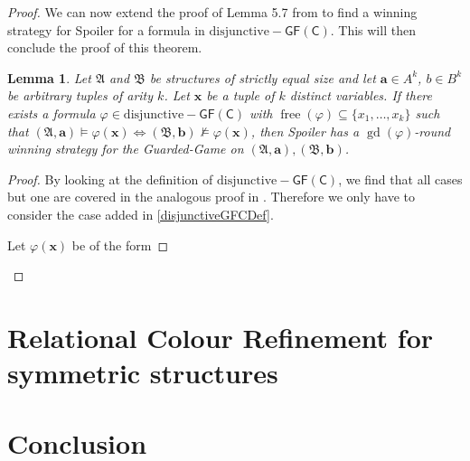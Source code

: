 \documentclass[a4paper,11pt,DIV=15]{scrartcl} %
\renewcommand{\phi}{\varphi}
\theoremstyle{plain}
\newtheorem{lemma}[theorem]{Lemma}
\theoremstyle{definition}
\newcommand{\GFC}{\mathsf{GF}(\mathsf{C})}
\newcommand{\free}[1]{\operatorname{free}(#1)}
\newcommand{\gd}[1]{\operatorname{gd}(#1)}
\newcommand{\disjunctiveGFC}{\operatorname{disjunctive-\GFC}}
\begin{document}
\begin{proof}
	We can now extend the proof of Lemma 5.7 from \cite{scheidt2025ColorRefinement} to find a winning strategy for Spoiler for a formula in $\disjunctiveGFC$.
	This will then conclude the proof of this theorem.
	
	\begin{lemma}
		Let $\mathfrak A$ and $\mathfrak B$ be structures of strictly equal size and let $\mathbf a\in A^k$, $b\in B^k$ be arbitrary tuples of arity $k$.
		Let $\mathbf x$ be a tuple of $k$ distinct variables.
		If there exists a formula $\phi\in\operatorname{disjunctive-\GFC}$ with $\free{\phi}\subseteq\{x_1,\dots,x_k\}$ such that $(\mathfrak A,\mathbf a)\models \phi(\mathbf x) \Longleftrightarrow (\mathfrak B,\mathbf b)\not\models \phi(\mathbf x)$, then Spoiler has a $\gd{\phi}$-round winning strategy for the Guarded-Game on $(\mathfrak A,\mathbf a),(\mathfrak B,\mathbf b)$.
	\end{lemma}
	\begin{proof}
		By looking at the definition of $\disjunctiveGFC$, we find that all cases but one are covered in the analogous proof in \cite{scheidt2025ColorRefinement}.
		Therefore we only have to consider the case added in \cref{disjunctiveGFCDef}.
		
		Let $\phi(\mathbf x)$ be of the form
	\end{proof}
\end{proof}



\section {Relational Colour Refinement for symmetric structures}


\section{Conclusion}



\clearpage



\end{document}
